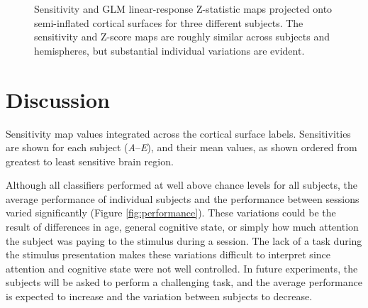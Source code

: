 \documentclass[5p,authoryear]{elsarticle}
\begin{document}
\begin{figure}
\small{}
\caption{Sensitivity and GLM linear-response Z-statistic maps projected onto semi-inflated cortical surfaces for three different subjects.
The sensitivity and Z-score maps are roughly similar across subjects and hemispheres, but substantial individual variations are evident.}
\label{fig:individual-sensitivity}
\end{figure}

\section{Discussion}

\begin{table}
\centering

\caption{Sensitivity map values integrated across the cortical surface labels. Sensitivities are shown for each subject (\emph{A}--\emph{E}), and their mean values, as shown ordered from greatest to least sensitive brain region.}
\label{tab:full-sensitivity}
\end{table}

Although all classifiers performed at well above chance levels for all subjects, the average performance of individual subjects and the performance between sessions varied significantly (Figure \ref{fig:performance}).
These variations could be the result of differences in age, general cognitive state, or simply how much attention the subject was paying to the stimulus during a session.
The lack of a task during the stimulus presentation makes these variations difficult to interpret since attention and cognitive state were not well controlled.
In future experiments, the subjects will be asked to perform a challenging task, and the average performance is expected to increase and the variation between subjects to decrease.
\end{document}

